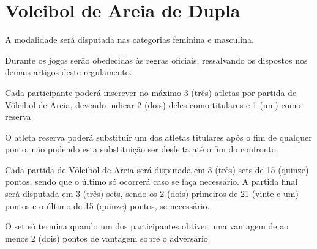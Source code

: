 {\let\clearpage\relax \chapter{Voleibol de Areia de Dupla}}

\begin{article}
	A modalidade será disputada nas categorias feminina e masculina.
\end{article}

\begin{article}
	Durante os jogos serão obedecidas às regras oficiais, ressalvando os dispostos nos demais artigos deste regulamento.
\end{article}

\begin{article}
	Cada participante poderá inscrever no máximo 3 (três) atletas por partida de Vôleibol de Areia, devendo indicar 2 (dois) deles como titulares e 1 (um) como reserva

	\begin{xparagraph}
		O atleta reserva poderá substituir um dos atletas titulares após o fim de qualquer ponto, não podendo esta substituição ser desfeita até o fim do confronto.
	\end{xparagraph}
\end{article}

\begin{article}
	Cada partida de Vôleibol de Areia será disputada em 3 (três) sets de 15 (quinze) pontos, sendo que o último só ocorrerá caso se faça necessário. A partida final será disputada em 3 (três) sets, sendo os 2 (dois) primeiros de 21 (vinte e um) pontos e o último de 15 (quinze) pontos, se necessário.

	\begin{xparagraph}
		O set só termina quando um dos participantes obtiver uma vantagem de ao menos 2 (dois) pontos de vantagem sobre o adversário
	\end{xparagraph}
\end{article}
